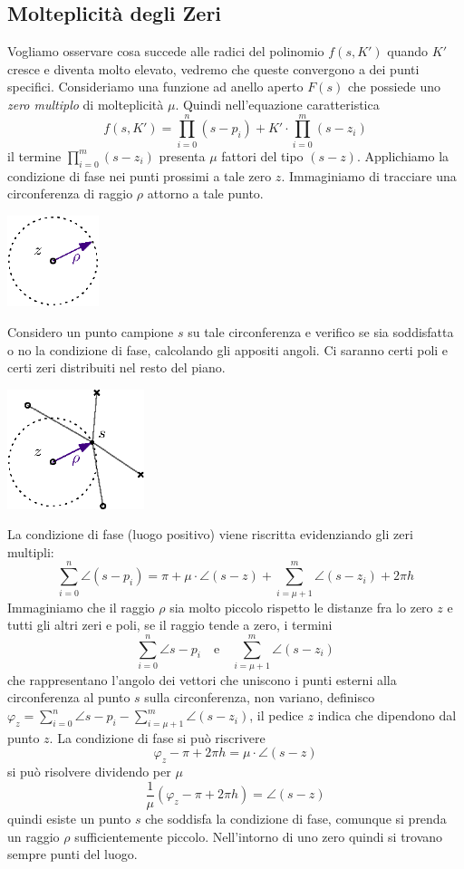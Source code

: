 \documentclass[10pt, letterpaper]{report}
\begin{document}
\subsection{Molteplicità degli Zeri}
Vogliamo osservare cosa succede alle radici del polinomio $f(s,K')$ quando $K'$ cresce e diventa molto elevato, vedremo che queste convergono a dei punti specifici. Consideriamo una funzione ad anello aperto $F(s)$ che possiede uno \textit{zero multiplo} di molteplicità $\mu$. Quindi nell'equazione caratteristica 
$$f(s,K')=\displaystyle\prod_{i=0}^n(s-p_i)+K'\cdot \displaystyle\prod_{i=0}^m(s-z_i) $$
il termine $\prod_{i=0}^m(s-z_i)$ presenta $\mu$ fattori del tipo $(s-z)$. Applichiamo la condizione di fase nei punti prossimi a tale zero $z$. Immaginiamo di tracciare una circonferenza di raggio $\rho$ attorno a tale punto.\begin{center}
    \includegraphics[width=0.2\textwidth ]{images/puntoZero.eps}
\end{center}
Considero un punto campione $s$ su tale circonferenza e verifico se sia soddisfatta o no la condizione di fase, calcolando gli appositi angoli. Ci saranno certi poli e certi zeri distribuiti nel resto del piano.
\begin{center}
    \includegraphics[width=0.3\textwidth ]{images/puntoZero2.eps}
\end{center}
La condizione di fase (luogo positivo) viene riscritta evidenziando gli zeri multipli:
$$ \sum_{i=0}^n \angle{(s-p_i)}=\pi + \mu\cdot \angle (s-z)+\sum_{i=\mu+1}^m \angle(s-z_i)+2\pi h$$
Immaginiamo che il raggio $\rho$ sia molto piccolo rispetto le distanze fra lo zero $z$ e tutti gli altri zeri e poli, se il raggio tende a zero, i termini 
$$ \sum_{i=0}^n \angle{s-p_i} \ \ \  \text{ e } \ \ \  \sum_{i=\mu+1}^m \angle(s-z_i) $$
che rappresentano l'angolo dei vettori che uniscono i punti esterni alla circonferenza al punto $s$ sulla circonferenza, non variano, definisco $\varphi_z=\sum_{i=0}^n \angle{s-p_i}-\sum_{i=\mu+1}^m \angle(s-z_i)$, il pedice $z$ indica che dipendono dal punto $z$. La condizione di fase si può riscrivere
$$\varphi_z -\pi+2\pi h = \mu \cdot \angle(s-z) $$
si può risolvere dividendo per $\mu$
$$\frac{1}{\mu}(\varphi_z -\pi+2\pi h) = \angle(s-z) $$
quindi esiste un punto $s$ che soddisfa la condizione di fase, comunque si prenda un raggio $\rho$ sufficientemente piccolo. Nell'intorno di uno zero quindi si trovano sempre punti del luogo. \bigskip 
\end{document}
